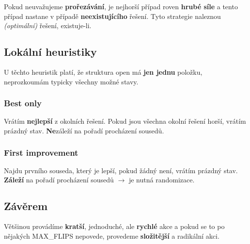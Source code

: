 Pokud neuvažujeme \textbf{prořezávání}, je nejhorší případ roven \textbf{hrubé síle} a tento případ nastane v případě \textbf{neexistujícího} řešení. Tyto strategie naleznou \textit{(optimální)} řešení, existuje-li.

\subsection{Lokální heuristiky}

U těchto heuristik platí, že struktura open má \textbf{jen jednu} položku, neprozkoumám typicky všechny možné stavy.

\subsubsection{Best only}

Vrátím \textbf{nejlepší} z okolních řešení. Pokud jsou všechna okolní řešení horší, vrátím prázdný stav. \textbf{Ne}záleží na pořadí procházení sousedů.

\subsubsection{First improvement}

Najdu prvního souseda, který je lepší, pokud žádný není, vrátím prázdný stav. \textbf{Záleží} na pořadí procházení sousedů $\to$ je nutná randomizace.

\subsection{Závěrem}

Většinou provádíme \textbf{kratší}, jednoduché, ale \textbf{rychlé} akce a pokud se to po nějakých MAX\_FLIPS nepovede, provedeme \textbf{složitější} a radikální akci. 
